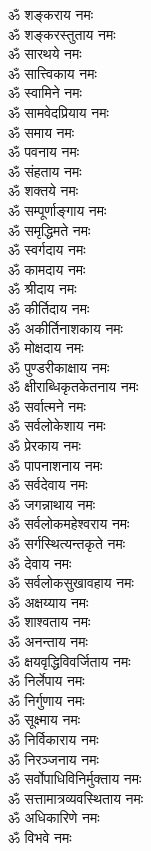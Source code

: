 \begin{multicols}{2}
\begin{flushleft}
ॐ शङ्कराय नमः\\
ॐ शङ्करस्तुताय नमः\\
ॐ सारथये नमः\\
ॐ सात्त्विकाय नमः\\
ॐ स्वामिने नमः\\
ॐ सामवेदप्रियाय नमः\hfill{}\\
ॐ समाय नमः\\
ॐ पवनाय नमः\\
ॐ संहताय नमः\\
ॐ शक्तये नमः\\
ॐ सम्पूर्णाङ्गाय नमः\\
ॐ समृद्धिमते नमः\\
ॐ स्वर्गदाय नमः\\
ॐ कामदाय नमः\\
ॐ श्रीदाय नमः\\
ॐ कीर्तिदाय नमः\hfill{}\\
ॐ अकीर्तिनाशकाय नमः\\
ॐ मोक्षदाय नमः\\
ॐ पुण्डरीकाक्षाय नमः\\
ॐ क्षीराब्धिकृतकेतनाय नमः\\
ॐ सर्वात्मने नमः\\
ॐ सर्वलोकेशाय नमः\\
ॐ प्रेरकाय नमः\\
ॐ पापनाशनाय नमः\\
ॐ सर्वदेवाय नमः\\
ॐ जगन्नाथाय नमः\hfill{}\\
ॐ सर्वलोकमहेश्वराय नमः\\
ॐ सर्गस्थित्यन्तकृते नमः\\
ॐ देवाय नमः\\
ॐ सर्वलोकसुखावहाय नमः\\
ॐ अक्षय्याय नमः\\
ॐ शाश्वताय नमः\\
ॐ अनन्ताय नमः\\
ॐ क्षयवृद्धिविवर्जिताय नमः\\
ॐ निर्लेपाय नमः\\
ॐ निर्गुणाय नमः\hfill{}\\
ॐ सूक्ष्माय नमः\\
ॐ निर्विकाराय नमः\\
ॐ निरञ्जनाय नमः\\
ॐ सर्वोपाधिविनिर्मुक्ताय नमः\\
ॐ सत्तामात्रव्यवस्थिताय नमः\\
ॐ अधिकारिणे नमः\\
ॐ विभवे नमः\\

\end{flushleft}
\end{multicols}
